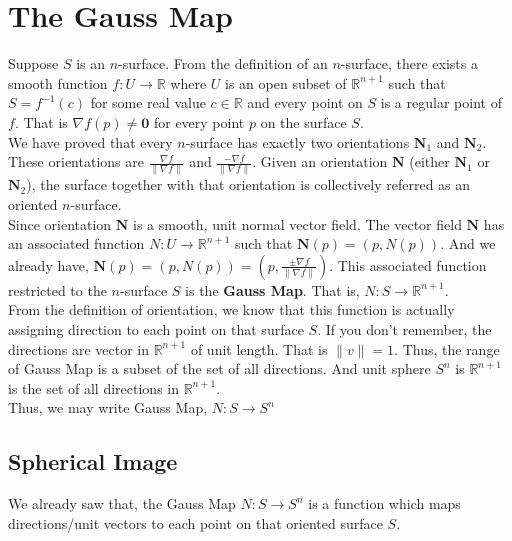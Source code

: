 \section{The Gauss Map}
	Suppose $S$ is an $n$-surface.
	From the definition of an $n$-surface, there exists a smooth function $f : U \to \mathbb{R}$ where $U$ is an open subset of $\mathbb{R}^{n+1}$ such that $S = f^{-1}(c)$ for some real value $c \in \mathbb{R}$ and every point on $S$ is a regular point of $f$.
	That is $\nabla f(p) \ne \boldsymbol{0}$ for every point $p$ on the surface $S$.\\

	We have proved that every $n$-surface has exactly two orientations $\boldsymbol{N}_1$ and $\boldsymbol{N}_2$.
	These orientations are $\frac{\nabla f}{\| \nabla f\|}$ and $\frac{-\nabla f}{\| \nabla f\|}$.
	Given an orientation $\boldsymbol{N}$ (either $\boldsymbol{N}_1$ or $\boldsymbol{N}_2$), the surface together with that orientation is collectively referred as an oriented $n$-surface.\\

	Since orientation $\boldsymbol{N}$ is a smooth, unit normal vector field.
	The vector field $\boldsymbol{N}$ has an associated function $N : U \to \mathbb{R}^{n+1}$ such that $\boldsymbol{N}(p) = (p,N(p))$.
	And we already have, $\boldsymbol{N}(p) = (p,N(p)) = (p, \frac{\pm \nabla f}{\| \nabla f\|})$.
	This associated function restricted to the $n$-surface $S$ is the \textbf{Gauss Map}.
	That is, $N : S \to \mathbb{R}^{n+1}$.\\

	From the definition of orientation, we know that this function is actually assigning direction to each point on that surface $S$.
	If you don't remember, the directions are vector in $\mathbb{R}^{n+1}$ of unit length.
	That is $\|v\| = 1$.
	Thus, the range of Gauss Map is a subset of the set of all directions.
	And unit sphere $S^n$ is $\mathbb{R}^{n+1}$ is the set of all directions in $\mathbb{R}^{n+1}$.\\

	Thus, we may write Gauss Map, $N : S \to S^n$
\subsection{Spherical Image}
	We already saw that, the Gauss Map $N : S \to S^n$ is a function which maps directions/unit vectors to each point on that oriented surface $S$.\\

